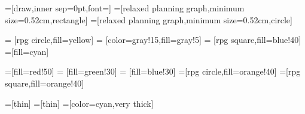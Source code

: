 

\subtitle{}
\date{April 29, 2020}


\usetikzlibrary{shapes}

=[draw,inner sep=0pt,font=\small]
=[relaxed planning graph,minimum size=0.52cm,rectangle]
=[relaxed planning graph,minimum size=0.52cm,circle]

=        [rpg circle,fill=yellow]
=    [color=gray!15,fill=gray!5]
=    [rpg square,fill=blue!40]
=[fill=cyan]

=[fill=red!50]
 = [fill=green!30]
 = [fill=blue!30]
=[rpg circle,fill=orange!40]
=[rpg square,fill=orange!40]

=[thin]
=[thin]
=[color=cyan,very thick]

\newcommand{\markplusone}[1]{\path (#1) +(-0.04cm,0.28cm) node {\tiny $+1$};}
\newcommand{\markopnode}[3][0.35cm]{\path (#2) +(0cm,#1) node {\tiny
    \ensuremath{#3}};}
\newcommand{\markopnodeff}[3][0.30cm]{\path (#2) +(0cm,#1) node {\tiny
    \ensuremath{#3}};}
\newcommand{\markopcost}[2]{\path (#1) +(0.45cm,0.15cm) node {\tiny $+#2$};}

\newcommand{\pre}{\ensuremath{\textit{pre}}}
\newcommand{\add}{\ensuremath{\textit{add}}}
\newcommand{\del}{\ensuremath{\textit{del}}}
\newcommand{\relaxation}[1]{\ensuremath{#1^+}}
\newcommand{\hplus}{\ensuremath{h^+}}
\newcommand{\hmax}{\ensuremath{h^{\textup{max}}}}
\newcommand{\hadd}{\ensuremath{h^{\textup{add}}}}
\newcommand{\hff}{\ensuremath{h^{\textup{FF}}}}



